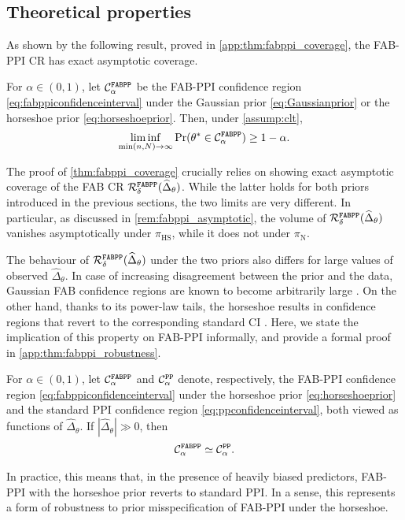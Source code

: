 \subsection{Theoretical properties}\label{sec:fabppi_theory}
As shown by the following result, proved in \cref{app:thm:fabppi_coverage}, the FAB-PPI CR has exact asymptotic coverage.
\begin{theorem}\label{thm:fabppi_coverage}
    For $\alpha \in (0, 1)$, let $\mathcal C_\alpha^{\mathrm{\texttt{FABPP}}}$ be the FAB-PPI confidence region \eqref{eq:fabppiconfidenceinterval} under the Gaussian prior \eqref{eq:Gaussianprior} or the horseshoe prior \eqref{eq:horseshoeprior}. Then, under \cref{assump:clt},
    \begin{equation*}
        \liminf_{\min(n,N) \to \infty} \Pr(\theta^* \in \mathcal C_\alpha^{\mathrm{\texttt{FABPP}}}) \geq 1 - \alpha.
    \end{equation*}
\end{theorem}
The proof of \cref{thm:fabppi_coverage} crucially relies on showing exact asymptotic coverage of the FAB CR $\mathcal R^{\mathrm{\texttt{FABPP}}}_\delta(\widehat\Delta_\theta)$. While the latter holds for both priors introduced in the previous sections, the two limits are very different. In particular, as discussed in \cref{rem:fabppi_asymptotic}, the volume of $\mathcal R^{\mathrm{\texttt{FABPP}}}_\delta(\widehat\Delta_\theta)$ vanishes asymptotically under $\pi_\text{HS}$, while it does not under $\pi_\text{N}$. 

The behaviour of $\mathcal R^{\mathrm{\texttt{FABPP}}}_\delta(\widehat\Delta_\theta)$ under the two priors also differs for large values of observed $\widehat\Delta_\theta$.
In case of increasing disagreement between the prior and the data, Gaussian FAB confidence regions are known to become arbitrarily large \citep{Yu2018}. 
On the other hand, thanks to its power-law tails, the horseshoe results in confidence regions that revert to the corresponding standard CI \citep{Cortinovis2024}.
Here, we state the implication of this property on FAB-PPI informally, and provide a formal proof in \cref{app:thm:fabppi_robustness}.
\begin{proposition}\label{prop:fabppi_robustness}
    For $\alpha\in(0,1)$, let $\mathcal C_\alpha^{\mathrm{\texttt{FABPP}}}$ and $\mathcal C_\alpha^{\mathrm{\texttt{PP}}}$ denote, respectively, the FAB-PPI confidence region \eqref{eq:fabppiconfidenceinterval} under the horseshoe prior \eqref{eq:horseshoeprior} and the standard PPI confidence region \eqref{eq:ppconfidenceinterval}, both viewed as functions of $\widehat\Delta_\theta$. If $|\widehat\Delta_\theta| \gg 0$, then
    \begin{align*}
        \mathcal C_\alpha^{\mathrm{\texttt{FABPP}}} \simeq \mathcal C_\alpha^{\mathrm{\texttt{PP}}}.
    \end{align*}
\end{proposition}
In practice, this means that, in the presence of heavily biased predictors, FAB-PPI with the horseshoe prior reverts to standard PPI. In a sense, this represents a form of robustness to prior misspecification of FAB-PPI under the horseshoe. 

